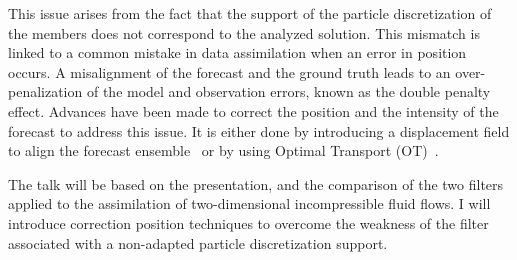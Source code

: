 \documentclass[a4paper,10pt,oneside]{article}
\begin{document}
This issue arises from the fact that the support of the particle discretization of the members does not correspond to the analyzed solution. This mismatch is linked to a common mistake in data assimilation when an error in position occurs. A misalignment of the forecast and the ground truth leads to an over-penalization of the model and observation errors, known as the double penalty effect. Advances have been made to correct the position and the intensity of the forecast to address this issue. It is either done by introducing a displacement field to align the forecast ensemble~\cite{ravela_data_2007} or by using Optimal Transport (OT)~\cite{feyeu2016}.

The talk will be based on the presentation, and the comparison of the two filters applied to the assimilation of two-dimensional incompressible fluid flows. I will introduce correction position techniques to overcome the weakness of the filter associated with a non-adapted particle discretization support.
\end{document}
